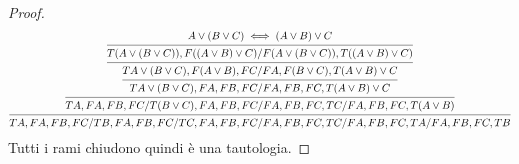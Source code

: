\begin{proof}
\begin{equation*}
\begin{prooftree}
\hypo{A \lor (B \lor C) \iff (A \lor B) \lor C}
\infer1 {T (A \lor (B \lor C)),F ((A \lor B) \lor C)/F (A \lor (B \lor C)),T ((A \lor B) \lor C)}
\infer1 {T A \lor (B \lor C),F (A \lor B),FC/FA,F (B \lor C),T (A \lor B) \lor C}
\infer1 {T A \lor (B \lor C),FA,FB,FC/FA,FB,FC,T (A \lor B) \lor C}
\infer1 {TA,FA,FB,FC/T (B \lor C),FA,FB,FC/FA,FB,FC,TC/FA,FB,FC,T (A \lor B)}
\infer1 {TA,FA,FB,FC/TB,FA,FB,FC/TC,FA,FB,FC/FA,FB,FC,TC/FA,FB,FC,TA/FA,FB,FC,TB}
\end{prooftree}
\end{equation*}
Tutti i rami chiudono quindi è una tautologia.
\end{proof}
